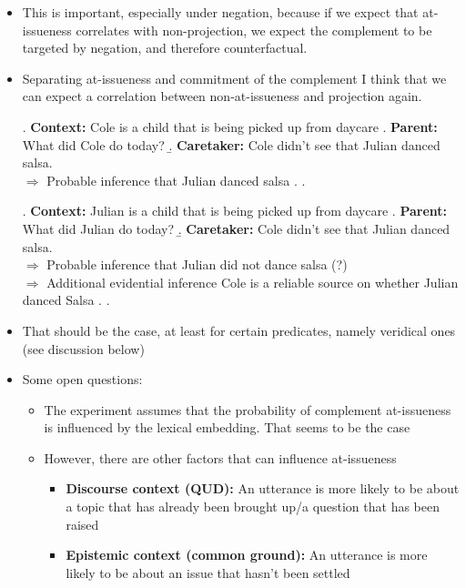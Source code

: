 \documentclass[11pt]{article}
\begin{document}
		\begin{itemize}
			\item This is important, especially under negation, because if we expect that at-issueness correlates with non-projection, we expect the complement to be targeted by negation, and therefore counterfactual.

			\item Separating at-issueness and commitment of the complement I think that we can expect a correlation between non-at-issueness and projection again.
				
				\ex. \textbf{Context:} Cole is a child that is being picked up from daycare
					\a. \textbf{Parent:} What did Cole do today?
					\b. \textbf{Caretaker:} Cole didn't see that Julian danced salsa.\\
					$\Rightarrow$ Probable inference that Julian danced salsa
					\z.
				\z.

				\ex. \textbf{Context:} Julian is a child that is being picked up from daycare 
					\a. \textbf{Parent:} What did Julian do today?
					\b. \textbf{Caretaker:} Cole didn't see that Julian danced salsa.\\
					$\Rightarrow$ Probable inference that Julian did not dance salsa (?)\\
					$\Rightarrow$ Additional evidential inference Cole is a reliable source on whether Julian danced Salsa
					\z.
				\z.

			\item That should be the case, at least for certain predicates, namely veridical ones (see discussion below)

			\item Some open questions:
			\begin{itemize}
				\item The experiment assumes that the probability of complement at-issueness is influenced by the lexical embedding. That seems to be the case

				\item However, there are other factors that can influence at-issueness
				\begin{itemize}
					\item \textbf{Discourse context (QUD):} An utterance is more likely to be about a topic that has already been brought up/a question that has been raised
					\item \textbf{Epistemic context (common ground):} An utterance is more likely to be about an issue that hasn't been settled
				\end{itemize}

			\end{itemize}

		\end{itemize}
\end{document}
